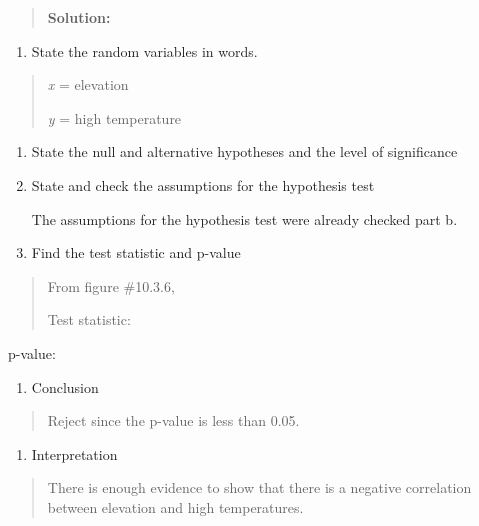 \documentclass[]{book}
\providecommand{\tightlist}{%
  \setlength{\itemsep}{0pt}\setlength{\parskip}{0pt}}
\begin{document}
\begin{quote}
\textbf{Solution:}
\end{quote}

\begin{enumerate}
\def\labelenumi{\arabic{enumi}.}
\tightlist
\item
  State the random variables in words.
\end{enumerate}

\begin{quote}
\emph{x} = elevation

\emph{y} = high temperature
\end{quote}

\begin{enumerate}
\def\labelenumi{\arabic{enumi}.}
\setcounter{enumi}{1}
\item
  State the null and alternative hypotheses and the level of
  significance
\item
  State and check the assumptions for the hypothesis test

  The assumptions for the hypothesis test were already checked part b.
\item
  Find the test statistic and p-value
\end{enumerate}

\begin{quote}
From figure \#10.3.6,

Test statistic:
\end{quote}

p-value:

\begin{enumerate}
\def\labelenumi{\arabic{enumi}.}
\setcounter{enumi}{4}
\tightlist
\item
  Conclusion
\end{enumerate}

\begin{quote}
Reject since the p-value is less than 0.05.
\end{quote}

\begin{enumerate}
\def\labelenumi{\arabic{enumi}.}
\setcounter{enumi}{5}
\tightlist
\item
  Interpretation
\end{enumerate}

\begin{quote}
There is enough evidence to show that there is a negative correlation
between elevation and high temperatures.
\end{quote}
\end{document}
